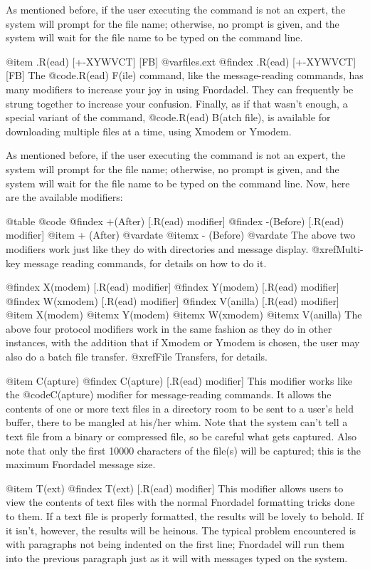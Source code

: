As mentioned before, if the user executing the
command is not an expert, the system will prompt for the file name;
otherwise, no prompt is given, and the system will wait for the file
name to be typed on the command line.

@item .R(ead) [+-XYWVCT] [FB] @var{files.ext}
@findex .R(ead) [+-XYWVCT] [FB]
The @code{.R(ead) F(ile)} command, like the message-reading commands,
has many modifiers to increase your joy in using Fnordadel.  They
can frequently be strung together to increase your confusion.  Finally,
as if that wasn't enough, a special variant of the command,
@code{.R(ead) B(atch file)}, is available for downloading multiple
files at a time, using Xmodem or Ymodem.

As mentioned before, if the user executing the
command is not an expert, the system will prompt for the file name;
otherwise, no prompt is given, and the system will wait for the file
name to be typed on the command line.  Now, here are the available
modifiers:

@table @code
@findex +(After) [.R(ead) modifier]
@findex -(Before) [.R(ead) modifier]
@item + (After) @var{date}
@itemx - (Before) @var{date}
The above two modifiers work just like they do with
directories and message display.  @xref{Multi-key message reading commands},
for details on how to do it.

@findex X(modem) [.R(ead) modifier]
@findex Y(modem) [.R(ead) modifier]
@findex W(xmodem) [.R(ead) modifier]
@findex V(anilla) [.R(ead) modifier]
@item X(modem)
@itemx Y(modem)
@itemx W(xmodem)
@itemx V(anilla)
The above four protocol modifiers work in the same fashion as they do in
other instances, with the addition that if Xmodem or Ymodem is chosen, the
user may also do a batch file transfer.  @xref{File Transfers}, for details.

@item C(apture)
@findex C(apture) [.R(ead) modifier]
This modifier works like the @code{C(apture)} modifier
for message-reading commands.  It allows the contents of one or more text
files in a directory room to be sent to a user's held
buffer, there to be mangled at his/her whim.  Note that the
system can't tell a text file from a binary or compressed file,
so be careful what gets captured.  Also note that only the first
10000 characters of the file(s) will be captured; this is the maximum
Fnordadel message size.

@item T(ext)
@findex T(ext) [.R(ead) modifier]
This modifier allows users to view the contents of
text files with the normal Fnordadel formatting tricks done
to them.  If a text file is properly formatted, the results
will be lovely to behold.  If it isn't, however, the results
will be heinous.  The typical problem encountered is with
paragraphs not being indented on the first line; Fnordadel
will run them into the previous paragraph just as it will with
messages typed on the system.

